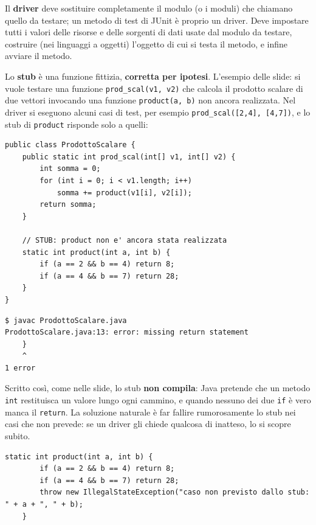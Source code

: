 Il \textbf{driver} deve sostituire completamente il modulo (o i moduli) che chiamano quello da testare; un metodo di
test di JUnit è proprio un driver. Deve impostare tutti i valori delle risorse e delle sorgenti di dati usate dal modulo
da testare, costruire (nei linguaggi a oggetti) l'oggetto di cui si testa il metodo, e infine avviare il metodo.

Lo \textbf{stub} è una funzione fittizia, \textbf{corretta per ipotesi}. L'esempio delle slide: si vuole testare una
funzione \texttt{prod\_scal(v1, v2)} che calcola il prodotto scalare di due vettori invocando una funzione
\texttt{product(a, b)} non ancora realizzata. Nel driver si eseguono alcuni casi di test, per esempio
\texttt{prod\_scal([2,4], [4,7])}, e lo stub di \texttt{product} risponde solo a quelli:

\begin{lstlisting}[style=java, name=ProdottoScalare.java]
public class ProdottoScalare {
    public static int prod_scal(int[] v1, int[] v2) {
        int somma = 0;
        for (int i = 0; i < v1.length; i++)
            somma += product(v1[i], v2[i]);
        return somma;
    }

    // STUB: product non e' ancora stata realizzata
    static int product(int a, int b) {
        if (a == 2 && b == 4) return 8;
        if (a == 4 && b == 7) return 28;
    }
}
\end{lstlisting}

\begin{lstlisting}[style=shell, name=Terminale]
$ javac ProdottoScalare.java
ProdottoScalare.java:13: error: missing return statement
    }
    ^
1 error
\end{lstlisting}

Scritto così, come nelle slide, lo stub \textbf{non compila}: Java pretende che un metodo \texttt{int} restituisca un
valore lungo ogni cammino, e quando nessuno dei due \texttt{if} è vero manca il \texttt{return}. La soluzione naturale è
far fallire rumorosamente lo stub nei casi che non prevede: se un driver gli chiede qualcosa di inatteso, lo si scopre
subito.

\begin{lstlisting}[style=java, name=ProdottoScalare.java, firstnumber=10]
    static int product(int a, int b) {
        if (a == 2 && b == 4) return 8;
        if (a == 4 && b == 7) return 28;
        throw new IllegalStateException("caso non previsto dallo stub: " + a + ", " + b);
    }
\end{lstlisting}

